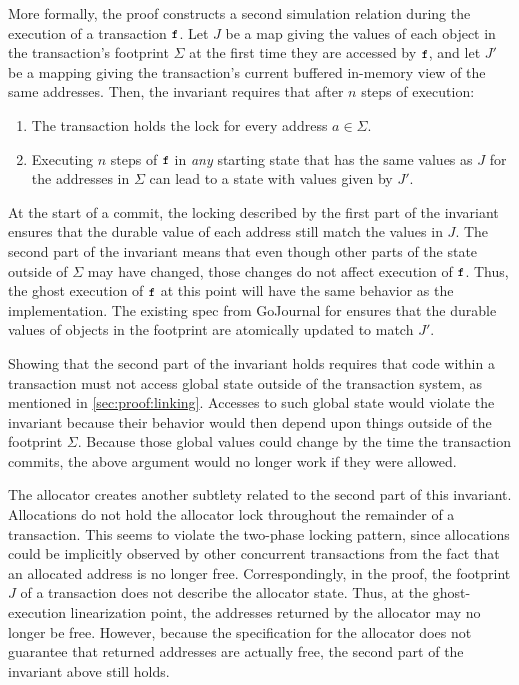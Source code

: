 More formally, the proof constructs a second simulation relation during the
execution of a transaction $\cc{f}$.  Let $J$ be a map giving the values of each
object in the transaction's footprint $\Sigma$ at the first time they are
accessed by $\cc{f}$, and let $J'$ be a mapping giving the transaction's current
buffered in-memory view of the same addresses.  Then, the invariant requires
that after $n$ steps of execution:
%
\begin{enumerate}

\item The transaction holds the lock for every address $a \in \Sigma$.

\item Executing $n$ steps of $\cc{f}$ in \emph{any} starting state that has the same
  values as $J$ for the addresses in $\Sigma$ can lead to a state with values given
  by $J'$.

\end{enumerate}
%
At the start of a commit, the locking described by the first part of the
invariant ensures that the durable value of each address still match the values
in $J$. The second part of the invariant means that even though other
parts of the state outside of $\Sigma$ may have changed, those changes do not
affect execution of $\cc{f}$. Thus, the ghost execution of $\cc{f}$ at this point will
have the same behavior as the implementation. The existing spec from GoJournal
for  ensures that the durable values of objects in the footprint are
atomically updated to match $J'$.

Showing that the second part of the invariant holds requires that code within a
transaction must not access global state outside of the
transaction system, as mentioned in \autoref{sec:proof:linking}. Accesses to such global state
would violate the invariant because their behavior would then depend upon
things outside of the footprint $\Sigma$. Because those global values could change
by the time the transaction commits, the above argument would no longer work if they were allowed.

The allocator creates another subtlety related to the second part of this
invariant. Allocations do not hold the allocator lock throughout the remainder
of a transaction. This seems to violate the two-phase locking pattern, since
allocations could be implicitly observed by other concurrent transactions from
the fact that an allocated address is no longer free. Correspondingly, in the
proof, the footprint $J$ of a transaction does not describe the allocator state.
Thus, at the ghost-execution linearization point, the addresses returned by the
allocator may no longer be free. However, because the specification for the
allocator does not guarantee that returned addresses are actually free, the
second part of the invariant above still holds.

